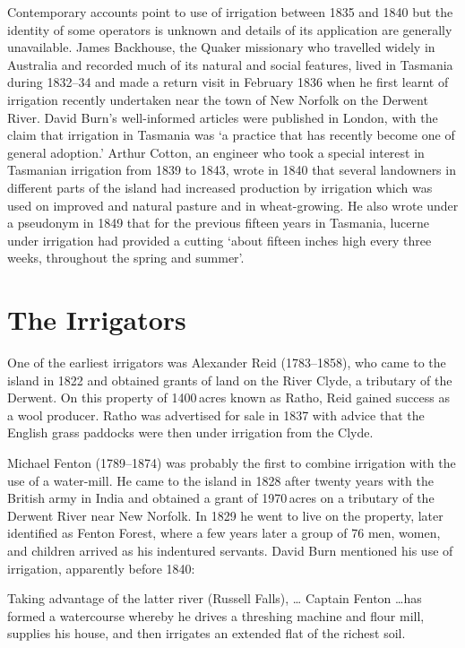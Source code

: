 Contemporary accounts point to use of irrigation between 1835 and 1840
but the identity of some operators is unknown and details of its
application are generally unavailable.  James
Backhouse, the Quaker missionary who travelled
widely in Australia and recorded much of its natural and social
features, lived in Tasmania during 1832--34 and made a return visit in
February 1836 when he first learnt of irrigation recently undertaken
near the town of New Norfolk on the Derwent
River. David Burn's well-informed
articles were published in London, with the claim that irrigation in
Tasmania was `a practice that has recently become one of general
adoption.'  Arthur Cotton, an engineer who took a
special interest in Tasmanian irrigation from 1839 to 1843, wrote in
1840 that several landowners in different parts of the island had
increased production by irrigation which was used on improved and
natural pasture and in wheat-growing.  He also wrote under a pseudonym
in 1849 that for the previous fifteen years in Tasmania,
lucerne under irrigation had provided a cutting `about
fifteen inches high every three weeks, throughout the spring and
summer'.

\section*{The Irrigators}

One of the earliest irrigators was Alexander Reid
(1783--1858), who came to the island in 1822 and obtained grants of
land on the River Clyde, a tributary of the
Derwent. On this property of 1400\,acres known as Ratho, Reid gained success as a wool producer.  Ratho was advertised
for sale in 1837 with advice that the English grass paddocks were then
under irrigation from the Clyde.

Michael Fenton (1789--1874) was probably the first
to combine irrigation with the use of a water-mill.
 He came to the
island in 1828 after twenty years with the British army in India and
obtained a grant of 1970\,acres on a tributary of the Derwent River
near New Norfolk. In 1829 he went to live on
the property, later identified as Fenton Forest, where a few years
later a group of 76 men, women, and children arrived as his indentured
servants.  David Burn mentioned his use of irrigation, apparently
before 1840:
\begin{Quote}
	Taking advantage of the latter river (Russell Falls), \ldots
	Captain Fenton \ldots has formed a watercourse whereby he
	drives a threshing machine and flour mill, supplies his house,
	and then irrigates an extended flat of the richest
	soil.
\end{Quote}

